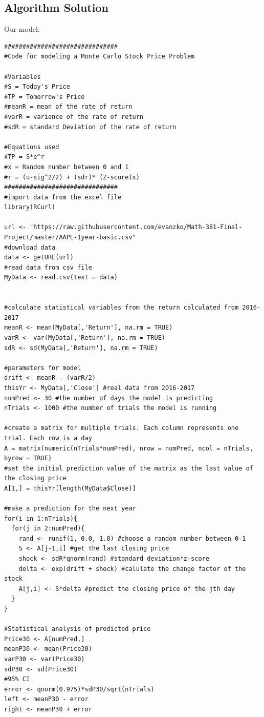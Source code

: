 \documentclass{article}
\begin{document}
\subsection{Algorithm Solution}
Our model:\\
\begin{verbatim}
###############################
#Code for modeling a Monte Carlo Stock Price Problem

#Variables
#S = Today's Price
#TP = Tomorrow's Price
#meanR = mean of the rate of return
#varR = varience of the rate of return
#sdR = standard Deviation of the rate of return

#Equations used
#TP = S*e^r
#x = Random number between 0 and 1
#r = (u-sig^2/2) + (sdr)* (Z-score(x)
###############################
#import data from the excel file
library(RCurl)

url <- "https://raw.githubusercontent.com/evanzko/Math-381-Final-Project/master/AAPL-1year-basic.csv"
#download data
data <- getURL(url) 
#read data from csv file
MyData <- read.csv(text = data)


#calculate statistical variables from the return calculated from 2016-2017
meanR <- mean(MyData[,'Return'], na.rm = TRUE) 
varR <- var(MyData[,'Return'], na.rm = TRUE)
sdR <- sd(MyData[,'Return'], na.rm = TRUE)

#parameters for model
drift <- meanR - (varR/2)
thisYr <- MyData[,'Close'] #real data from 2016-2017 
numPred <- 30 #the number of days the model is predicting
nTrials <- 1000 #the number of trials the model is running

#create a matrix for multiple trials. Each column represents one trial. Each row is a day
A = matrix(numeric(nTrials*numPred), nrow = numPred, ncol = nTrials, byrow = TRUE)
#set the initial prediction value of the matrix as the last value of the closing price
A[1,] = thisYr[length(MyData$Close)]

#make a prediction for the next year
for(i in 1:nTrials){
  for(j in 2:numPred){
    rand <- runif(1, 0.0, 1.0) #choose a random number between 0-1
    S <- A[j-1,i] #get the last closing price
    shock <- sdR*qnorm(rand) #standard deviation*z-score
    delta <- exp(drift + shock) #calulate the change factor of the stock
    A[j,i] <- S*delta #predict the closing price of the jth day
  }
}

#Statistical analysis of predicted price
Price30 <- A[numPred,]
meanP30 <- mean(Price30)
varP30 <- var(Price30)
sdP30 <- sd(Price30)
#95% CI
error <- qnorm(0.975)*sdP30/sqrt(nTrials)
left <- meanP30 - error
right <- meanP30 + error




\end{verbatim}
\end{document}
